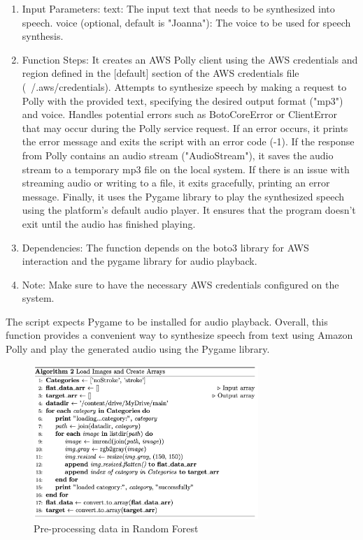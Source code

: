 \begin{enumerate}
    \item Input Parameters:
    text: The input text that needs to be synthesized into speech.
    voice (optional, default is "Joanna"): The voice to be used for speech synthesis.
    \item Function Steps:
    It creates an AWS Polly client using the AWS credentials and region defined in the [default] section of the AWS credentials file (~/.aws/credentials).
    Attempts to synthesize speech by making a request to Polly with the provided text, specifying the desired output format ("mp3") and voice.
    Handles potential errors such as BotoCoreError or ClientError that may occur during the Polly service request. If an error occurs, it prints the error message and exits the script with an error code (-1).
    If the response from Polly contains an audio stream ("AudioStream"), it saves the audio stream to a temporary mp3 file on the local system.
    If there is an issue with streaming audio or writing to a file, it exits gracefully, printing an error message.
    Finally, it uses the Pygame library to play the synthesized speech using the platform's default audio player. It ensures that the program doesn't exit until the audio has finished playing.
    \item Dependencies:
    The function depends on the boto3 library for AWS interaction and the pygame library for audio playback.
    \item Note:
    Make sure to have the necessary AWS credentials configured on the system.
\end{enumerate}

The script expects Pygame to be installed for audio playback.
Overall, this function provides a convenient way to synthesize speech from text using Amazon Polly and play the generated audio using the Pygame library.

\begin{figure}[H]
    \centering
    \includegraphics[width=8.5cm]{images/preprocessing.png}
    \caption{Pre-processing data in Random Forest}
    \label{fig:enter-label}
\end{figure}

